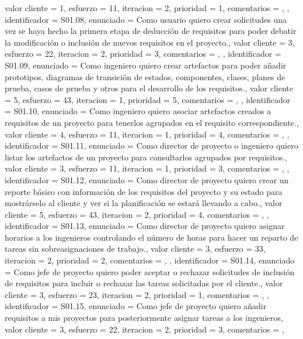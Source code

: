 \documentclass[a4paper, 12pt, spanish]{memoria}
\begin{document}
{{    valor cliente = 1,
    esfuerzo      = {1}{1},
    iteracion     = 2,
    prioridad     = 1,
    comentarios   = {},
},{%
    identificador = S01.08,
    enunciado     = {Como usuario quiero crear solicitudes una vez se haya hecho la primera etapa de deducción de requisitos para poder debatir la modificación o inclusión de nuevos requisitos en el proyecto.},
    valor cliente = 3,
    esfuerzo      = {2}{2},
    iteracion     = 2,
    prioridad     = 3,
    comentarios   = {},
},{%
    identificador = S01.09,
    enunciado     = {Como ingeniero quiero crear artefactos para poder añadir prototipos, diagramas de transición de estados, componentes, clases, planes de prueba, casos de prueba y otros para el desarrollo de los requisitos.},
    valor cliente = 5,
    esfuerzo      = {4}{3},
    iteracion     = 1,
    prioridad     = 5,
    comentarios   = {},
},{%
    identificador = S01.10,
    enunciado     = {Como ingeniero quiero asociar artefactos creados a requisitos de un proyecto para tenerlos agrupados en el requisito correspondiente.},
    valor cliente = 4,
    esfuerzo      = {1}{1},
    iteracion     = 1,
    prioridad     = 4,
    comentarios   = {},
},{%
    identificador = S01.11,
    enunciado     = {Como director de proyecto o ingeniero quiero listar los artefactos de un proyecto para consultarlos agrupados por requisitos.},
    valor cliente = 3,
    esfuerzo      = {1}{1},
    iteracion     = 1,
    prioridad     = 3,
    comentarios   = {},
},{%
    identificador = S01.12,
    enunciado     = {Como director de proyecto quiero crear un reporte básico con información de los requisitos del proyecto y su estado para mostrárselo al cliente y ver si la planificación se estará llevando a cabo.},
    valor cliente = 5,
    esfuerzo      = {4}{3},
    iteracion     = 2,
    prioridad     = 4,
    comentarios   = {},
},{%
    identificador = S01.13,
    enunciado     = {Como director de proyecto quiero asignar horarios a los ingenieros controlando el número de horas para hacer un reparto de tareas sin sobreasignaciones de trabajo.},
    valor cliente = 3,
    esfuerzo      = {3}{3},
    iteracion     = 2,
    prioridad     = 2,
    comentarios   = {},
},{%
    identificador = S01.14,
    enunciado     = {Como jefe de proyecto quiero poder aceptar o rechazar solicitudes  de inclusión de requisitos para incluir o rechazar las tareas solicitadas por el cliente.},
    valor cliente = 3,
    esfuerzo      = {2}{3},
    iteracion     = 2,
    prioridad     = 1,
    comentarios   = {},
},{%
    identificador = S01.15,
    enunciado     = {Como jefe de proyecto quiero añadir requisitos a mis proyectos para posteriormente asignar tareas a los ingenieros},
    valor cliente = 3,
    esfuerzo      = {2}{2},
    iteracion     = 2,
    prioridad     = 3,
    comentarios   = {},
}} %

\end{document}
